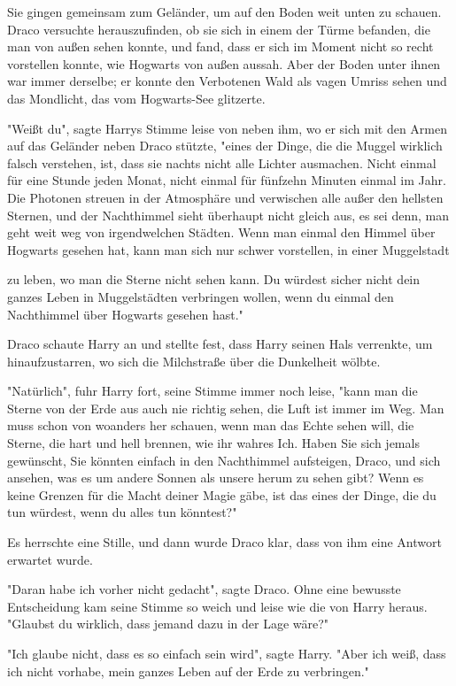 {Sie gingen gemeinsam zum Geländer, um auf den Boden weit unten zu schauen. Draco versuchte herauszufinden, ob sie sich in einem der Türme befanden, die man von außen sehen konnte, und fand, dass er sich im Moment nicht so recht vorstellen konnte, wie Hogwarts von außen aussah. Aber der Boden unter ihnen war immer derselbe; er konnte den Verbotenen Wald als vagen Umriss sehen und das Mondlicht, das vom Hogwarts-See glitzerte.

"Weißt du", sagte Harrys Stimme leise von neben ihm, wo er sich mit den Armen auf das Geländer neben Draco stützte, "eines der Dinge, die die Muggel wirklich falsch verstehen, ist, dass sie nachts nicht alle Lichter ausmachen. Nicht einmal für eine Stunde jeden Monat, nicht einmal für fünfzehn Minuten einmal im Jahr. Die Photonen streuen in der Atmosphäre und verwischen alle außer den hellsten Sternen, und der Nachthimmel sieht überhaupt nicht gleich aus, es sei denn, man geht weit weg von irgendwelchen Städten. Wenn man einmal den Himmel über Hogwarts gesehen hat, kann man sich nur schwer vorstellen, in einer Muggelstadt

zu leben, wo man die Sterne nicht sehen kann. Du würdest sicher nicht dein ganzes Leben in Muggelstädten verbringen wollen, wenn du einmal den Nachthimmel über Hogwarts gesehen hast."

Draco schaute Harry an und stellte fest, dass Harry seinen Hals verrenkte, um hinaufzustarren, wo sich die Milchstraße über die Dunkelheit wölbte.

"Natürlich", fuhr Harry fort, seine Stimme immer noch leise, "kann man die Sterne von der Erde aus auch nie richtig sehen, die Luft ist immer im Weg. Man muss schon von woanders her schauen, wenn man das Echte sehen will, die Sterne, die hart und hell brennen, wie ihr wahres Ich. Haben Sie sich jemals gewünscht, Sie könnten einfach in den Nachthimmel aufsteigen, Draco, und sich ansehen, was es um andere Sonnen als unsere herum zu sehen gibt? Wenn es keine Grenzen für die Macht deiner Magie gäbe, ist das eines der Dinge, die du tun würdest, wenn du alles tun könntest?"

Es herrschte eine Stille, und dann wurde Draco klar, dass von ihm eine Antwort erwartet wurde.

"Daran habe ich vorher nicht gedacht", sagte Draco. Ohne eine bewusste Entscheidung kam seine Stimme so weich und leise wie die von Harry heraus. "Glaubst du wirklich, dass jemand dazu in der Lage wäre?"

"Ich glaube nicht, dass es so einfach sein wird", sagte Harry. "Aber ich weiß, dass ich nicht vorhabe, mein ganzes Leben auf der Erde zu verbringen."

}
